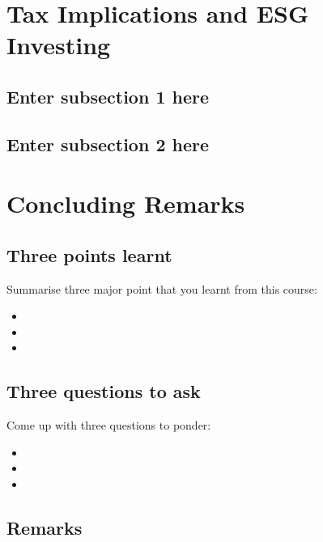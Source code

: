 \documentclass[
]{book}
\providecommand{\tightlist}{%
  \setlength{\itemsep}{0pt}\setlength{\parskip}{0pt}}
\begin{document}
\chapter{Tax Implications and ESG Investing}\label{ch9}

\section{Enter subsection 1 here}\label{enter-subsection-1-here-7}

\section{Enter subsection 2 here}\label{enter-subsection-2-here-7}

\chapter*{Concluding Remarks}\label{concluding-remarks}

\section*{Three points learnt}\label{three-points-learnt}

Summarise three major point that you learnt from this course:

\begin{itemize}
\tightlist
\item
\item
\item
\end{itemize}

\section*{Three questions to ask}\label{three-questions-to-ask}

Come up with three questions to ponder:

\begin{itemize}
\tightlist
\item
\item
\item
\end{itemize}

\section*{Remarks}\label{remarks}
\end{document}
